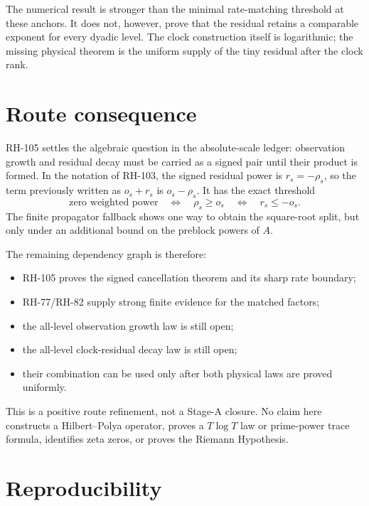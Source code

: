 \documentclass[11pt]{article}
\theoremstyle{definition}
\theoremstyle{remark}
\begin{document}
The numerical result is stronger than the minimal rate-matching threshold at
these anchors.  It does not, however, prove that the residual retains a
comparable exponent for every dyadic level.  The clock construction itself is
logarithmic; the missing physical theorem is the uniform supply of the tiny
residual after the clock rank.

\section{Route consequence}
\label{sec:route}

RH-105 settles the algebraic question in the absolute-scale ledger:
observation growth and residual decay must be carried as a signed pair until
their product is formed.  In the notation of RH-103, the signed residual
power is $r_s=-\rho_s$, so the term previously written as $o_s+r_s$ is
$o_s-\rho_s$.  It has the exact threshold
\[
 \text{zero weighted power}\quad\Longleftrightarrow\quad
 \rho_s\ge o_s
 \quad\Longleftrightarrow\quad r_s\le-o_s.
\]
The finite propagator fallback shows one way to obtain the square-root split,
but only under an additional bound on the preblock powers of $A$.

The remaining dependency graph is therefore:
\begin{itemize}[leftmargin=2.2em]
 \item RH-105 proves the signed cancellation theorem and its sharp rate
       boundary;
 \item RH-77/RH-82 supply strong finite evidence for the matched factors;
 \item the all-level observation growth law is still open;
 \item the all-level clock-residual decay law is still open;
 \item their combination can be used only after both physical laws are
       proved uniformly.
\end{itemize}

This is a positive route refinement, not a Stage-A closure.  No claim here
constructs a Hilbert--Polya operator, proves a $T\log T$ law or prime-power
trace formula, identifies zeta zeros, or proves the Riemann Hypothesis.

\section{Reproducibility}
\end{document}
